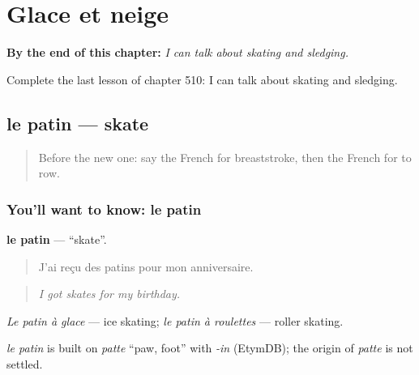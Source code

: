 
\chapter{Glace et neige}
\label{ch:fr-glace-et-neige}

\begin{chapteropening}
\textbf{By the end of this chapter:} \emph{I can talk about skating and sledging.}

Complete the last lesson of chapter 510: I can talk about skating and sledging.
\end{chapteropening}

\section[le patin]{le patin — skate}

\label{lesson:FR-C510-patin}



\begin{quote}
Before the new one: say the French for breaststroke, then the French for to row.
\end{quote}

\subsection*{You'll want to know: le patin}
\textbf{le patin} — \textquotedblleft{}skate\textquotedblright{}.

\begin{quote}
J'ai reçu des patins pour mon anniversaire.
\end{quote}

\begin{quote}
\emph{I got skates for my birthday.}
\end{quote}

\emph{Le patin à glace} — ice skating; \emph{le patin à roulettes} — roller skating.

\begin{cousinweb}
\emph{le patin} is built on \emph{patte} \textquotedblleft{}paw, foot\textquotedblright{} with \emph{-in} (EtymDB); the origin of \emph{patte} is not settled.
\end{cousinweb}

